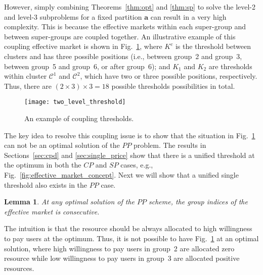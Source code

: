 \documentclass[twocolumn,10pt,twosided]{IEEEtran}
\newtheorem{lemma}{Lemma}
\begin{document}
However, simply combining Theorems~\ref{thm:opt} and \ref{thm:sp} to solve the level-2 and level-3 subproblems for a fixed partition $\boldsymbol{a}$ can result in a very high complexity.  This is because the effective markets within each super-group and between super-groups are coupled together. An illustrative  example of this coupling effective market is shown in Fig.~\ref{fig:two_level_threshold}, where $K^c$ is the threshold between clusters and has three possible positions (i.e., between group~2 and group~3, between group~5 and group~6, or after group~6); and $K_1$ and $K_2$ are thresholds within cluster $\mathcal{C}^1$ and  $\mathcal{C}^2$, which have two or three possible positions, respectively. Thus, there are $(2\times 3)\times 3=18$ possible thresholds possibilities in total.

\begin{figure}[ht]
\centering
\texttt{[image: two\_level\_threshold]}
\caption{An example of coupling thresholds. }
\label{fig:two_level_threshold}
\end{figure}

The key idea to resolve this coupling issue is to show that the situation in Fig.~\ref{fig:two_level_threshold} can not be an optimal solution of the $PP$ problem. The results in Sections~\ref{sec:cpd} and \ref{sec:single_price} show that there is a unified threshold at the optimum in both the $CP$ and $SP$ cases, e.g., Fig.~\ref{fig:effective_market_concept}.  Next we will show that a unified single threshold also exists in the $PP$ case.

\begin{lemma}
\label{le:consecutive_index} At any optimal solution of the $PP$ scheme, the group indices of the effective market is consecutive.
\end{lemma}


 The intuition is that the resource should be always allocated to high willingness to pay users at the optimum. Thus, it is not possible to have Fig.~\ref{fig:two_level_threshold}  at an optimal solution, where high willingness to pay users in group~2 are allocated zero resource while low willingness to pay users in group~3 are allocated positive resources.
\end{document}
